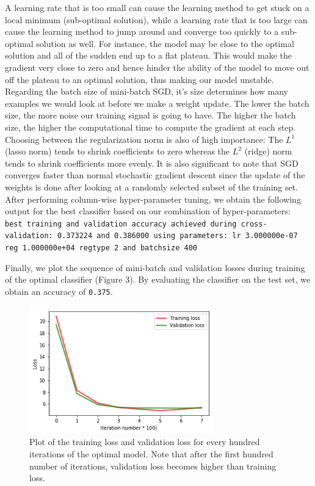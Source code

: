 \documentclass{article}
\def\code#1{\texttt{#1}}
\begin{document}
    A learning rate that is too small can cause the learning method to get stuck on a local minimum (sub-optimal solution), while a learning rate that is too large can cause the learning method to jump around and converge too quickly to a sub-optimal solution as well. For instance, the model may be close to the optimal solution and all of the sudden end up to a flat plateau. This would make the gradient very close to zero and hence hinder the ability of the model to move out off the plateau to an optimal solution, thus making our model unstable. Regarding the batch size of mini-batch SGD, it's size determines how many examples we would look at before we make a weight update. The lower the batch size, the more noise our training signal is going to have. The higher the batch size, the higher the computational time to compute the gradient at each step. Choosing between the regularization norm is also of high importance: The $L^1$ (lasso norm) tends to shrink coefficients to zero whereas the $L^2$ (ridge) norm tends to shrink coefficients more evenly. It is also significant to note that SGD converges faster than normal stochastic gradient descent since the update of the weights is done after looking at a randomly selected subset of the training set. \\
    
    After performing column-wise hyper-parameter tuning, we obtain the following output for the best classifier based on our combination of hyper-parameters: \\
    
    \code{best training and validation accuracy achieved during cross-validation: 0.373224 and 0.386000
    	using parameters: lr 3.000000e-07 reg 1.000000e+04 reg\textunderscore type 2 and batch\textunderscore size 400}
 
    \vspace{8pt}
    
    Finally, we plot the sequence of mini-batch and validation losses during training of the optimal classifier (Figure 3). By evaluating the classifier on the test set, we obtain an accuracy of \code{0.375}. \\
    
    \begin{figure}[t]
    	\centering
    	\includegraphics[width=8cm]{images/training_vs_validation_loss.png}
    	\caption{Plot of the training loss and validation loss for every hundred iterations of the optimal model. Note that after the first hundred number of iterations, validation loss becomes higher than training loss.}
    \end{figure}
   
\end{document}
